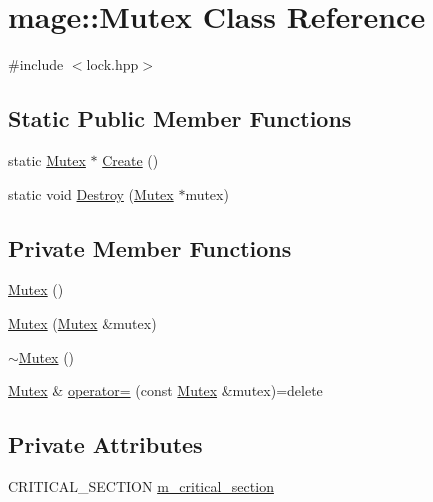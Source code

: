 \hypertarget{classmage_1_1_mutex}{}\section{mage\+:\+:Mutex Class Reference}
\label{classmage_1_1_mutex}


{\ttfamily \#include $<$lock.\+hpp$>$}

\subsection*{Static Public Member Functions}
\begin{DoxyCompactItemize}
\item 
static \hyperlink{classmage_1_1_mutex}{Mutex} $\ast$ \hyperlink{classmage_1_1_mutex_a48d784fa6bffd4088d9f89a2a9cca84e}{Create} ()
\item 
static void \hyperlink{classmage_1_1_mutex_a78cd1aff434b1d7cefce4c8339c25d8f}{Destroy} (\hyperlink{classmage_1_1_mutex}{Mutex} $\ast$mutex)
\end{DoxyCompactItemize}
\subsection*{Private Member Functions}
\begin{DoxyCompactItemize}
\item 
\hyperlink{classmage_1_1_mutex_ab22db01311271ef54642b10ea53dfd8a}{Mutex} ()
\item 
\hyperlink{classmage_1_1_mutex_a0f38f170668eb1fe3c2f110738edc39e}{Mutex} (\hyperlink{classmage_1_1_mutex}{Mutex} \&mutex)
\item 
\hyperlink{classmage_1_1_mutex_a143d82ec7bb43f953a1703caa7972e9d}{$\sim$\+Mutex} ()
\item 
\hyperlink{classmage_1_1_mutex}{Mutex} \& \hyperlink{classmage_1_1_mutex_a56072bdabdeadd5d897de232dbd298a0}{operator=} (const \hyperlink{classmage_1_1_mutex}{Mutex} \&mutex)=delete
\end{DoxyCompactItemize}
\subsection*{Private Attributes}
\begin{DoxyCompactItemize}
\item 
C\+R\+I\+T\+I\+C\+A\+L\+\_\+\+S\+E\+C\+T\+I\+ON \hyperlink{classmage_1_1_mutex_a18414337aef28b7ed261e7a805d2c103}{m\+\_\+critical\+\_\+section}
\end{DoxyCompactItemize}
